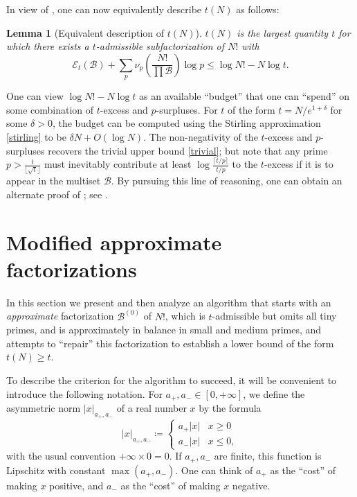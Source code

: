 \documentclass[10pt,a4paper,reqno]{amsart}
\numberwithin{equation}{section}
\theoremstyle{plain}
\newtheorem{lemma}[lemma]{Lemma}
\theoremstyle{definition}
\newcommand\tuple{{\mathcal B}}
\newcommand\excess{{\mathcal{E}}}
\begin{document}
In view of , one can now equivalently describe
$t(N)$ as follows:

\begin{lemma}[Equivalent description of $t(N)$]\label{t-descrip}  $t(N)$ is the largest quantity $t$ for which there exists a $t$-admissible subfactorization of $N!$ with
$$ \excess_t(\tuple) + \sum_p \nu_p\left( \frac{N!}{\prod \tuple} \right) \log p \leq \log N! - N \log t.$$
\end{lemma}

One can view $\log N! - N\log t$ as an available ``budget'' that one can ``spend'' on some combination of $t$-excess and $p$-surpluses.  For $t$ of the form $t = N/e^{1+\delta}$ for some $\delta>0$, the budget can be computed using the Stirling approximation \eqref{stirling} to be $\delta N + O(\log N)$.  The non-negativity of the $t$-excess and $p$-surpluses recovers the trivial upper bound \eqref{trivial}; but note that any prime $p > \frac{t}{\lfloor \sqrt{t} \rfloor}$ must inevitably contribute at least $\log \frac{\lceil t/p\rceil}{t/p}$ to the $t$-excess if it is to appear in the multiset $\tuple$.  By pursuing this line of reasoning, one can obtain an alternate proof of ; see \cite[Lemma 2.1]{tao}.

\section{Modified approximate factorizations}\label{approx-sec}

In this section we present and then analyze an algorithm that starts with an \emph{approximate} factorization $\tuple^{(0)}$ of $N!$, which is $t$-admissible but omits all tiny primes, and is approximately in balance in small and medium primes, and attempts to ``repair'' this factorization to establish a lower bound of the form $t(N) \geq t$.

To describe the criterion for the algorithm to succeed, it will be convenient to introduce the following notation.
For $a_+,a_- \in [0,+\infty]$, we define the asymmetric norm $|x|_{a_+,a_-}$ of a real number $x$ by the formula
$$
|x|_{a_+,a_-} \coloneqq  \begin{cases}
  a_+ |x| & x\geq 0 \\
  a_- |x| & x\leq 0,
\end{cases}
$$
with the usual convention $+\infty \times 0 = 0$.
If $a_+,a_-$ are finite, this function is Lipschitz with constant $\max(a_+,a_-)$.  One can think of $a_+$ as the ``cost'' of making $x$ positive, and $a_-$ as the
``cost'' of making $x$ negative.
\end{document}

